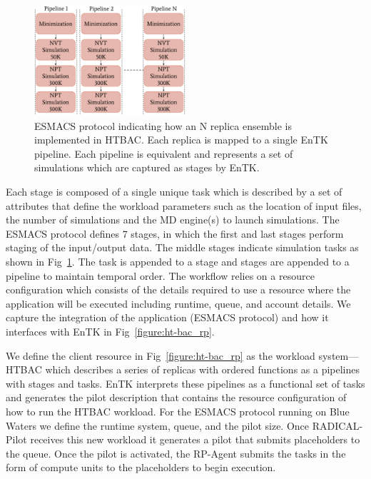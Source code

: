 \documentclass[conference]{IEEEtran}
\begin{document}
\begin{figure}
\centering
  \includegraphics[width=0.5\textwidth]{HT-BAC_NAMD_pipelines_control_flow_only.pdf}
  \caption{ESMACS protocol indicating how an N replica ensemble is implemented in HTBAC.
  Each replica is mapped to a single EnTK pipeline.
  Each pipeline is equivalent and represents a set of simulations which are captured as stages by
  EnTK.}\label{figure:ESMACS-pipelines}
\end{figure}

%
%
%
%
%
%
%
%
%
%

Each stage is composed of a single unique task which is described by a set of
attributes that define the workload parameters such as the location of input
files, the number of simulations and the MD engine(s) to launch simulations.
The ESMACS protocol defines 7 stages, in which the first and last
stages perform staging of the input/output data. The middle stages indicate
simulation tasks as shown in Fig~\ref{figure:ESMACS-pipelines}. The task is
appended to a stage and stages are appended to a pipeline to maintain
temporal order. The workflow relies on a resource configuration which
consists of the details required to use a resource where the application will
be executed including runtime, queue, and account details. We capture the
integration of the application (ESMACS protocol) and how it interfaces with
EnTK in Fig~\ref{figure:ht-bac_rp}.

We define the client resource in Fig~\ref{figure:ht-bac_rp} as the workload
system---HTBAC which describes a series of replicas with ordered functions as
a pipelines with stages and tasks. EnTK interprets these pipelines as a
functional set of tasks and generates the pilot description that contains the
resource configuration of how to run the HTBAC workload. For the ESMACS
protocol running on Blue Waters we define the runtime system, queue, and the
pilot size. Once RADICAL-Pilot receives this new workload it generates a
pilot that submits placeholders to the queue. Once the pilot is activated,
the RP-Agent submits the tasks in the form of compute units to the
placeholders to begin execution.
\end{document}

